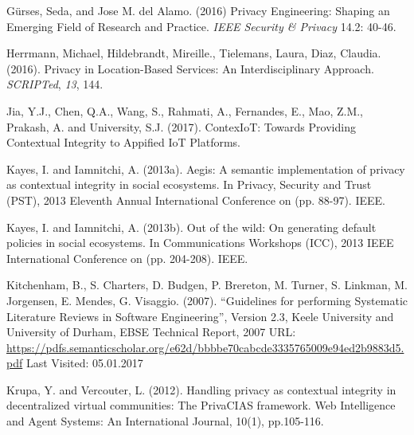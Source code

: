 \documentclass[../thesis.tex]{subfiles}
\begin{document}
\bigskip

\textcolor[rgb]{0.13333334,0.13333334,0.13333334}{G\"urses, Seda, and
Jose M. del Alamo. (2016) {\textquotedbl}Privacy Engineering: Shaping
an Emerging Field of Research and Practice.{\textquotedbl}
}\textit{\textcolor[rgb]{0.13333334,0.13333334,0.13333334}{IEEE
Security \& Privacy}}\textcolor[rgb]{0.13333334,0.13333334,0.13333334}{
14.2: 40-46.}


\bigskip

\textcolor[rgb]{0.13333334,0.13333334,0.13333334}{Herrmann, Michael,
Hildebrandt, Mireille., Tielemans, Laura, Diaz, Claudia. (2016).
Privacy in Location-Based Services: An Interdisciplinary Approach.
}\textit{\textcolor[rgb]{0.13333334,0.13333334,0.13333334}{SCRIPTed}}\textcolor[rgb]{0.13333334,0.13333334,0.13333334}{,
}\textit{\textcolor[rgb]{0.13333334,0.13333334,0.13333334}{13}}\textcolor[rgb]{0.13333334,0.13333334,0.13333334}{,
144.}


\bigskip

Jia, Y.J., Chen, Q.A., Wang, S., Rahmati, A., Fernandes, E., Mao, Z.M.,
Prakash, A. and University, S.J. (2017). ContexIoT: Towards Providing
Contextual Integrity to Appified IoT Platforms.


\bigskip

Kayes, I. and Iamnitchi, A. (2013a). Aegis: A semantic implementation of
privacy as contextual integrity in social ecosystems. In Privacy,
Security and Trust (PST), 2013 Eleventh Annual International Conference
on (pp. 88-97). IEEE.


\bigskip

Kayes, I. and Iamnitchi, A. (2013b). Out of the wild: On generating
default policies in social ecosystems. In Communications Workshops
(ICC), 2013 IEEE International Conference on (pp. 204-208). IEEE.


\bigskip

Kitchenham, B., S. Charters, D. Budgen, P. Brereton, M. Turner, S.
Linkman, M. Jorgensen, E. Mendes, G. Visaggio. (2007).
``Guidelines for performing Systematic Literature
Reviews in Software Engineering'', Version 2.3, Keele
University and University of Durham, EBSE Technical Report, 2007 URL:
\url{https://pdfs.semanticscholar.org/e62d/bbbbe70cabcde3335765009e94ed2b9883d5.pdf}
Last Visited: 05.01.2017

Krupa, Y. and Vercouter, L. (2012). Handling privacy as contextual
integrity in decentralized virtual communities: The PrivaCIAS
framework. Web Intelligence and Agent Systems: An International
Journal, 10(1), pp.105-116.
\end{document}
